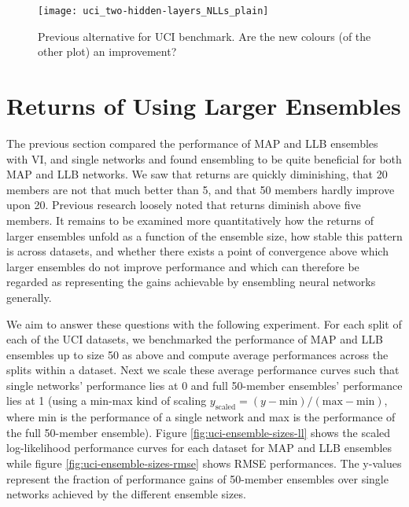 \documentclass[../thesis.tex]{subfiles}
\begin{document}
\begin{figure}
    \centering
    \texttt{[image: uci\_two-hidden-layers\_NLLs\_plain]} 
    \caption{Previous alternative for UCI benchmark. Are the new colours (of the other plot) an improvement?}
    \label{fig:uci-benchmark-old}
\end{figure}


\section{Returns of Using Larger Ensembles}
The previous section compared the performance of MAP and LLB ensembles with VI, and single networks and found ensembling to be quite beneficial for both MAP and LLB networks. We saw that returns are quickly diminishing, that 20 members are not that much better than 5, and that 50 members hardly improve upon 20. Previous research loosely noted that returns diminish above five members. It remains to be examined more quantitatively how the returns of larger ensembles unfold as a function of the ensemble size, how stable this pattern is across datasets, and whether there exists a point of convergence above which larger ensembles do not improve performance and which can therefore be regarded as representing the gains achievable by ensembling neural networks generally.

We aim to answer these questions with the following experiment. For each split of each of the UCI datasets, we benchmarked the performance of MAP and LLB ensembles up to size 50 as above and compute average performances across the splits within a dataset. Next we scale these average performance curves such that single networks' performance lies at 0 and full 50-member ensembles' performance lies at 1 (using a min-max kind of scaling $y_{\text{scaled}} = (y - \text{min}) / (\text{max} - \text{min})$, where min is the performance of a single network and max is the performance of the full 50-member ensemble). Figure \ref{fig:uci-ensemble-sizes-ll} shows the scaled log-likelihood performance curves for each dataset for MAP and LLB ensembles while figure \ref{fig:uci-ensemble-sizes-rmse} shows RMSE performances. The y-values represent the fraction of performance gains of 50-member ensembles over single networks achieved by the different ensemble sizes. 
\end{document}

